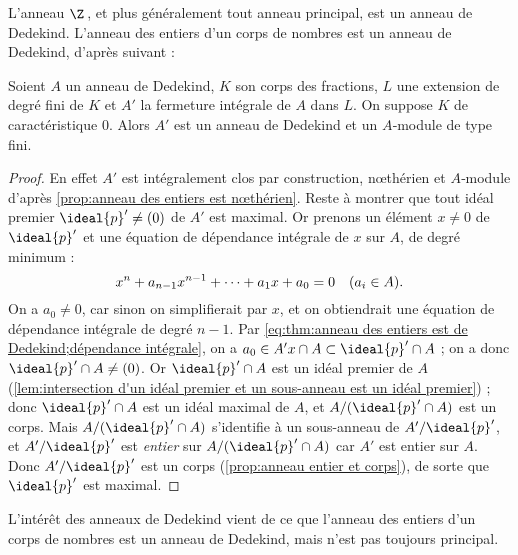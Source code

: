 \documentclass[11pt, %
  title in boldface,
  theorem in new line,
  theorem numbering = section,
  number theorems separately,
  simple name,
]{beaulivre}
\begin{document}
    L'anneau \( \Z \)\,, et plus généralement tout anneau principal, est un anneau de Dedekind. L'anneau des entiers d'un corps de nombres est un anneau de Dedekind, d'après  suivant :

    \begin{theorem}\label{thm:anneau des entiers est de Dedekind}
        Soient \( A \) un anneau de Dedekind, \( K \) son corps des fractions, \( L \) une extension de degré fini de \( K \) et \( A' \) la fermeture intégrale de \( A \) dans \( L \). On suppose \( K \) de caractéristique \( 0 \). Alors \( A' \) est un anneau de Dedekind et un \( A \)‑module de type fini.
    \end{theorem}
    \begin{proof}
        En effet \( A' \) est intégralement clos par construction, nœthérien et \( A \)‑module d'après \cref{prop:anneau des entiers est nœthérien}. Reste à montrer que tout idéal premier \( \ideal{p}' \neq (0) \) de \( A' \) est maximal. Or prenons un élément \( x \neq 0 \) de \( \ideal{p}' \) et une équation de dépendance intégrale de \( x \) sur \( A \), de degré minimum :
        \begin{equation}\label{eq:thm:anneau des entiers est de Dedekind;dépendance intégrale}
            x^n + a_{n-1}x^{n-1} + \cdots + a_1 x + a_0 = 0 \quad \text{(\( a_i \in A \))}.
        \end{equation}
        On a \( a_0 \neq 0 \), car sinon on simplifierait par \( x \), et on obtiendrait une équation de dépendance intégrale de degré \( n-1 \). Par \eqref{eq:thm:anneau des entiers est de Dedekind;dépendance intégrale}, on a \( a_0 \in A'x \cap A \subset \ideal{p}' \cap A \) ; on a donc \( \ideal{p}' \cap A \neq (0) \). Or \( \ideal{p}' \cap A \) est un idéal premier de \( A \) (\cref{lem:intersection d'un idéal premier et un sous-anneau est un idéal premier}) ; donc \( \ideal{p}' \cap A \) est un idéal maximal de \( A \), et \( A/(\ideal{p}' \cap A) \) est un corps. Mais \( A/(\ideal{p}' \cap A) \) s'identifie à un sous-anneau de \( A'/\ideal{p}' \), et \( A'/\ideal{p}' \) est \emph{entier} sur \( A/(\ideal{p}' \cap A) \) car \( A' \) est entier sur \( A \). Donc \( A'/\ideal{p}' \) est un corps (\cref{prop:anneau entier et corps}), de sorte que \( \ideal{p}' \) est maximal.
    \end{proof}

    L'intérêt des anneaux de Dedekind vient de ce que l'anneau des entiers d'un corps de nombres est un anneau de Dedekind, mais n'est pas toujours principal.
\end{document}
